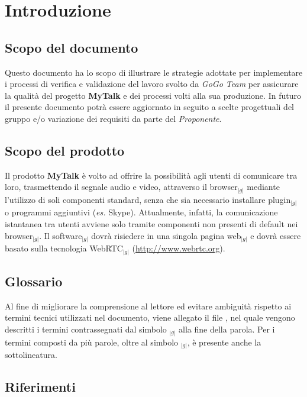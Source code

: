 \section{Introduzione}{
    \subsection{Scopo del documento}{
	Questo documento ha lo scopo di illustrare le strategie adottate per implementare i processi di verifica e validazione del lavoro svolto da 
	\textit{GoGo Team} per assicurare la qualità del progetto \textbf{MyTalk} e dei processi volti alla sua produzione. In futuro il presente documento
	potrà essere aggiornato in seguito a scelte progettuali del gruppo e/o variazione dei requisiti da parte del \textit{Proponente}.
    }
    
    \subsection{Scopo del prodotto}{
      Il prodotto \textbf{MyTalk} è volto ad offrire la possibilità agli utenti di comunicare tra loro, trasmettendo il segnale audio e video, attraverso 
      il browser$_{|g|}$ mediante l'utilizzo di soli componenti standard, senza che sia necessario installare plugin$_{|g|}$ o programmi aggiuntivi 
      (\textit{es.} Skype). Attualmente, infatti, la comunicazione istantanea tra utenti avviene solo tramite componenti non presenti di default nei
      browser$_{|g|}$. Il software$_{|g|}$ dovrà risiedere in una singola pagina web$_{|g|}$ e dovrà essere basato sulla tecnologia WebRTC$_{|g|}$ 
      (\url {http://www.webrtc.org}).
    }

    \subsection{Glossario}{
	Al fine di migliorare la comprensione al lettore ed evitare ambiguità rispetto ai termini tecnici utilizzati nel documento, viene allegato il file
	\emph{\Glossario},  nel quale vengono descritti i termini contrassegnati dal simbolo $_{|g|}$ alla fine della parola.
	Per i termini composti da più parole, oltre al simbolo $_{|g|}$, è presente anche la sottolineatura. 
    }

    \subsection{Riferimenti}{
}}
